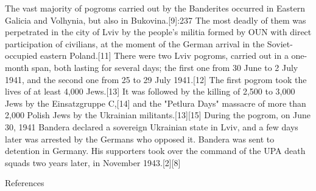 The vast majority of pogroms carried out by the Banderites occurred in Eastern
Galicia and Volhynia, but also in Bukovina.[9]:237 The most deadly of them was
perpetrated in the city of Lviv by the people's militia formed by OUN with
direct participation of civilians, at the moment of the German arrival in the
Soviet-occupied eastern Poland.[11] There were two Lviv pogroms, carried out in
a one-month span, both lasting for several days; the first one from 30 June to
2 July 1941, and the second one from 25 to 29 July 1941.[12] The first pogrom
took the lives of at least 4,000 Jews.[13] It was followed by the killing of
2,500 to 3,000 Jews by the Einsatzgruppe C,[14] and the "Petlura Days" massacre
of more than 2,000 Polish Jews by the Ukrainian militants.[13][15] During the
pogrom, on June 30, 1941 Bandera declared a sovereign Ukrainian state in Lviv,
and a few days later was arrested by the Germans who opposed it. Bandera was
sent to detention in Germany. His supporters took over the command of the UPA
death squads two years later, in November 1943.[2][8] 

References

